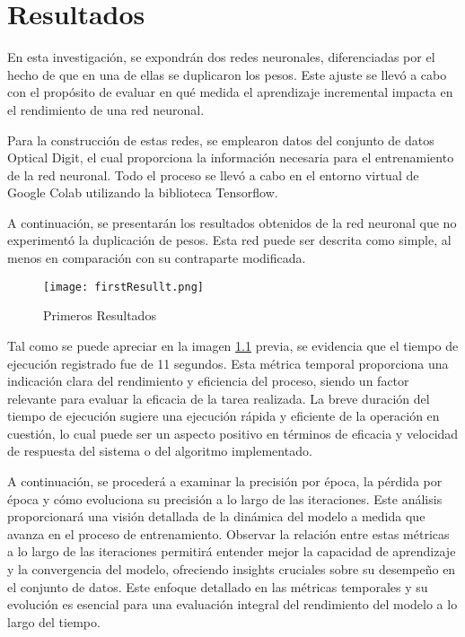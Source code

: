 \chapter{Resultados}
  En esta investigación, se expondrán dos redes neuronales, diferenciadas por el hecho de que en una de ellas se duplicaron los pesos. Este ajuste se llevó a cabo con el propósito de evaluar en qué medida el aprendizaje incremental impacta en el rendimiento de una red neuronal.

  Para la construcción de estas redes, se emplearon datos del conjunto de datos Optical Digit, el cual proporciona la información necesaria para el entrenamiento de la red neuronal. Todo el proceso se llevó a cabo en el entorno virtual de Google Colab utilizando la biblioteca Tensorflow.

  A continuación, se presentarán los resultados obtenidos de la red neuronal que no experimentó la duplicación de pesos. Esta red puede ser descrita como simple, al menos en comparación con su contraparte modificada.

  \begin{figure}[H]
    \centering
    \texttt{[image: firstResullt.png]}
    \caption{Primeros Resultados}
    \label{fig: first result and time}
  \end{figure}

  Tal como se puede apreciar en la imagen \ref{fig: first result and time}  previa, se evidencia que el tiempo de ejecución registrado fue de 11 segundos. Esta métrica temporal proporciona una indicación clara del rendimiento y eficiencia del proceso, siendo un factor relevante para evaluar la eficacia de la tarea realizada. La breve duración del tiempo de ejecución sugiere una ejecución rápida y eficiente de la operación en cuestión, lo cual puede ser un aspecto positivo en términos de eficacia y velocidad de respuesta del sistema o del algoritmo implementado.

  A continuación, se procederá a examinar la precisión por época, la pérdida por época y cómo evoluciona su precisión a lo largo de las iteraciones. Este análisis proporcionará una visión detallada de la dinámica del modelo a medida que avanza en el proceso de entrenamiento. Observar la relación entre estas métricas a lo largo de las iteraciones permitirá entender mejor la capacidad de aprendizaje y la convergencia del modelo, ofreciendo insights cruciales sobre su desempeño en el conjunto de datos. Este enfoque detallado en las métricas temporales y su evolución es esencial para una evaluación integral del rendimiento del modelo a lo largo del tiempo.

